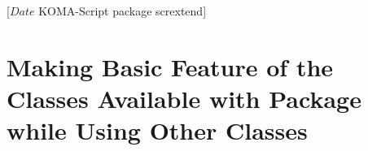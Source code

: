 %
%
%
%
%
%
%
%
% 
%
%
%
%

                 [$Date$
                  KOMA-Script package scrextend]


\chapter[{\KOMAScript{} Features for other Classes with Package
  \Package{scrextend}}]{Making Basic Feature of the \KOMAScript{} Classes
  Available with Package  while Using Other Classes}
\BeginIndexGroup%
%

